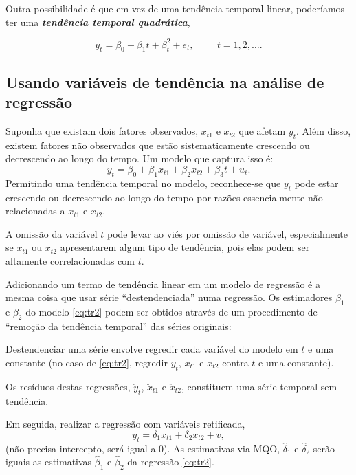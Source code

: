 \documentclass[
]{book}
\theoremstyle{definition}
\theoremstyle{definition}
\theoremstyle{definition}
\theoremstyle{remark}
\begin{document}
Outra possibilidade é que em vez de uma tendência temporal linear, poderíamos ter uma
\textbf{\emph{tendência temporal quadrática}},

\begin{equation}
y_t = \beta_0+ \beta_1t +\beta_t^2+ e_t, \hspace{1cm} t = 1, 2, \ldots.
\label{eq:quadtend}
\end{equation}

\hypertarget{usando-variuxe1veis-de-tenduxeancia-na-anuxe1lise-de-regressuxe3o}{%
\subsection{Usando variáveis de tendência na análise de regressão}\label{usando-variuxe1veis-de-tenduxeancia-na-anuxe1lise-de-regressuxe3o}}

Suponha que existam dois fatores observados, \(x_{t1}\) e \(x_{t2}\) que afetam \(y_t\). Além disso,
existem fatores não observados que estão sistematicamente crescendo ou decrescendo ao longo do tempo.
Um modelo que captura isso é:
\begin{equation}
y_t = \beta_0 + \beta_1x_{t1} + \beta_2x_{t2} + \beta_3t + u_t.
\label{eq:tr2}
\end{equation}
Permitindo uma tendência temporal no modelo, reconhece-se que \(y_t\) pode estar crescendo
ou decrescendo ao longo do tempo por razões essencialmente não relacionadas a \(x_{t1}\) e \(x_{t2}\).

A omissão da variável \(t\) pode levar ao viés por omissão de variável, especialmente se \(x_{t1}\) ou \(x_{t2}\) apresentarem algum tipo de tendência, pois elas podem ser altamente correlacionadas com \(t\).

Adicionando um termo de tendência linear em um modelo de regressão é a mesma coisa que usar
série ``destendenciada'' numa regressão. Os estimadores \(\beta_1\) e \(\beta_2\) do modelo \eqref{eq:tr2} podem ser obtidos através de um procedimento de ``remoção da tendência temporal'' das séries originais:

Destendenciar uma série envolve regredir cada variável do modelo em \(t\) e uma constante (no caso de \eqref{eq:tr2}, regredir \(y_t\), \(x_{t1}\) e \(x_{t2}\) contra \(t\) e uma constante).

Os resíduos destas regressões, \(\ddot{y}_t\), \(\ddot{x}_{t1}\) e \(\ddot{x}_{t2}\), constituem uma série temporal sem tendência.

Em seguida, realizar a regressão com variáveis retificada,
\begin{equation}
\ddot{y}_t= \delta_1\ddot{x}_{t1}+\delta_2\ddot{x}_{t2}+v,
\label{eq:varrat}
\end{equation}
(não precisa intercepto, será igual a 0). As estimativas via MQO, \(\hat{\delta}_1\) e \(\hat{\delta}_2\) serão iguais as estimativas \(\hat{\beta}_1\) e \(\hat{\beta}_2\) da regressão \eqref{eq:tr2}.
\end{document}
